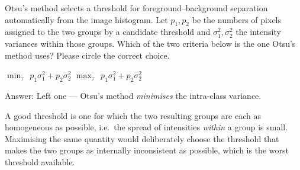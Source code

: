 \documentclass[11pt]{exam}
\newcommand{\answerspace}[1]{\ifprintanswers\else\vspace{#1}\fi}
\begin{document}
\begin{questions}

\question
Otsu's method selects a threshold for foreground--background separation automatically from the
image histogram. Let $p_1, p_2$ be the numbers of pixels assigned to the two groups by a candidate
threshold and $\sigma_1^2, \sigma_2^2$ the intensity variances within those groups. Which of the
two criteria below is the one Otsu's method uses? Please circle the correct choice.

\vspace{2mm}
\begin{center}
  $\displaystyle \min_\tau\ \ p_1 \sigma_1^2 + p_2 \sigma_2^2$
  \hspace{3.2cm}
  $\displaystyle \max_\tau\ \ p_1 \sigma_1^2 + p_2 \sigma_2^2$
\end{center}
\vspace{2mm}

\begin{solution}
  Answer: Left one --- Otsu's method \emph{minimises} the intra-class variance.

  A good threshold is one for which the two resulting groups are each as homogeneous as possible,
  i.e.\ the spread of intensities \emph{within} a group is small. Maximising the same quantity
  would deliberately choose the threshold that makes the two groups as internally inconsistent as
  possible, which is the worst threshold available.
\end{solution}
\answerspace{1.5cm}


\end{questions}
\end{document}
